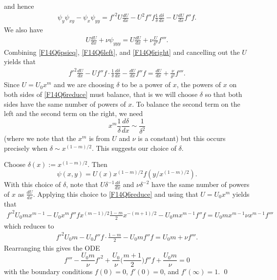 and hence
\begin{align}\label{F14Q6left}
\psi_{y}\psi_{xy} - \psi_{x}\psi_{yy} = f'^{2}U\frac{dU}{dx} - U^{2}f''f\frac{1}{\delta}\frac{d\delta}{dx} - U\frac{dU}{dx}f''f.
\end{align}
We also have
\begin{align}\label{F14Q6right}
U\frac{dU}{dx} + \nu\psi_{yyy} = U\frac{dU}{dx} + \nu\frac{U}{\delta^{2}}f'''.
\end{align}
Combining \eqref{F14Q6psieq}, \eqref{F14Q6left}, and \eqref{F14Q6right} and cancelling out the $U$ yields that
\begin{align}\label{F14Q6reduce}
f'^{2}\frac{dU}{dx} - Uf''f\cdot \frac{1}{\delta}\frac{d\delta}{dx} - \frac{dU}{dx}f'' f = \frac{dU}{dx} + \frac{\nu}{\delta^{2}}f'''.
\end{align}
Since $U = U_{0}x^{m}$ and we are choosing $\delta$ to be a power of $x$, the powers of $x$ on both sides of \eqref{F14Q6reduce} must balance, that is we will choose $\delta$ so
that both sides have the same number of powers of $x$. To balance the second term on the left and the second term on the right, we
need $$x^{m}\frac{1}{\delta}\frac{d\delta}{dx} \sim \frac{1}{\delta^{2}}$$ (where we note that the $x^{m}$ is from $U$ and $\nu$ is a constant) but this occurs precisely when $\delta \sim x^{(1 - m)/2}$.
This suggests our choice of $\delta$.

Choose $\delta(x) := x^{(1- m)/2}$. Then
$$\psi(x, y) = U(x)x^{(1 - m)/2}f(y/x^{(1- m)/2}).$$
With this choice of $\delta$, note that $U\delta^{-1}\frac{d\delta}{dx}$ and $\nu\delta^{-2}$ have the same number of powers of $x$
as $\frac{dU}{dx}$. Applying this choice to \eqref{F14Q6reduce} and using that $U = U_{0}x^{m}$ yields that
\begin{align*}
f'^{2}U_{0}mx^{m - 1} - U_{0}x^{m}f''f x^{(m - 1)/2}\frac{1 - m}{2}x^{-(m + 1)/2} - U_{0}mx^{m - 1}f'' f = U_{0}mx^{m - 1}\nu x^{m - 1}f'''
\end{align*}
which reduces to
\begin{align*}
f'^{2}U_{0}m - U_{0}f''f\cdot \frac{1 - m}{2} - U_{0}mf'' f = U_{0}m + \nu f'''.
\end{align*}
Rearranging this gives the ODE
$$f''' - \frac{U_{0}m}{\nu}f'^{2} + \frac{U_{0}}{\nu}\bigg(\frac{m + 1}{2}\bigg)f'' f + \frac{U_{0}m}{\nu} = 0$$
with the boundary conditions $f(0) = 0$, $f'(0) = 0$, and $f'(\infty) = 1$.
\hfill\qed







